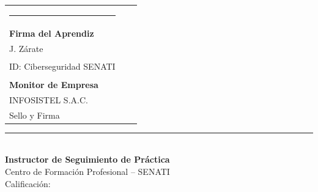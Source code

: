\documentclass[11pt,a4paper]{article}
\begin{document}
\begin{tcolorbox}[colback=white,colframe=senatiblue,arc=2mm,title=\textbf{CONFORMIDAD Y FIRMAS DE REVISIÓN}]
    \vspace{1.5cm}
    \begin{tabularx}{\textwidth}{X c X}
        \centering \rule{5cm}{0.6pt} \\ \textbf{Firma del Aprendiz} \\ J. Zárate \\ ID: Ciberseguridad SENATI & &
        \centering \rule{5cm}{0.6pt} \\ \textbf{Monitor de Empresa} \\ INFOSISTEL S.A.C. \\ Sello y Firma \\
    \end{tabularx}

    \vspace{1.8cm}

    \begin{center}
        \rule{6cm}{0.6pt} \\
        \textbf{Instructor de Seguimiento de Práctica} \\
        Centro de Formación Profesional -- SENATI \\
        Calificación: \underline{\hspace{2.5cm}}
    \end{center}
    \vspace{0.4cm}
\end{tcolorbox}
\end{document}
